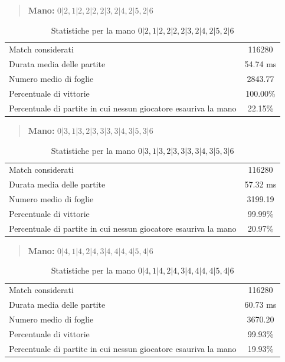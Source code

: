 \documentclass[a4paper,12pt]{report} %
\begin{document}
\begin{quote}
    \textbf{Mano:} \(0|2, 1|2, 2|2, 2|3, 2|4, 2|5, 2|6\)
\end{quote}

\begin{table}[h!]
    \centering
    \begin{tabular}{|l|c|}
        \hline
        Match considerati & 116280 \\
        Durata media delle partite &  54.74 ms \\
        Numero medio di foglie &  2843.77 \\
        Percentuale di vittorie & 100.00\% \\
        Percentuale di partite in cui nessun giocatore esauriva la mano &  22.15\% \\
        \hline
    \end{tabular}
    \caption{Statistiche per la mano \(0|2, 1|2, 2|2, 2|3, 2|4, 2|5, 2|6\)}
    \label{tab:stats_tutti_2}
\end{table}


\begin{quote}
    \textbf{Mano:} \(0|3, 1|3, 2|3, 3|3, 3|4, 3|5, 3|6\)
\end{quote}

\begin{table}[h!]
    \centering
    \begin{tabular}{|l|c|}
        \hline
        Match considerati & 116280 \\
        Durata media delle partite &  57.32 ms \\
        Numero medio di foglie &  3199.19 \\
        Percentuale di vittorie & 99.99\% \\
        Percentuale di partite in cui nessun giocatore esauriva la mano &  20.97\% \\
        \hline
    \end{tabular}
    \caption{Statistiche per la mano \(0|3, 1|3, 2|3, 3|3, 3|4, 3|5, 3|6\)}
    \label{tab:stats_tutti_3}
\end{table}


\begin{quote}
    \textbf{Mano:} \(0|4, 1|4, 2|4, 3|4, 4|4, 4|5, 4|6\)
\end{quote}

\begin{table}[h!]
    \centering
    \begin{tabular}{|l|c|}
        \hline
        Match considerati & 116280 \\
        Durata media delle partite &  60.73 ms \\
        Numero medio di foglie &  3670.20 \\
        Percentuale di vittorie & 99.93\% \\
        Percentuale di partite in cui nessun giocatore esauriva la mano &  19.93\% \\
        \hline
    \end{tabular}
    \caption{Statistiche per la mano \(0|4, 1|4, 2|4, 3|4, 4|4, 4|5, 4|6\)}
    \label{tab:stats_tutti_4}
\end{table}
\end{document}
